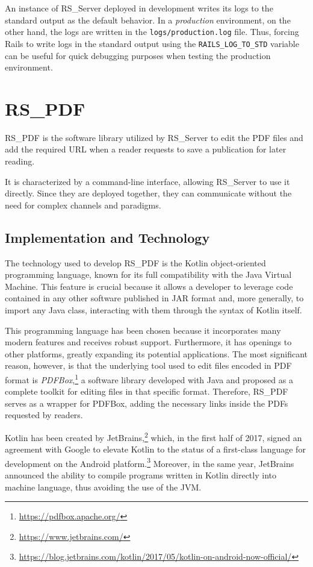 \documentclass[a4paper, english]{article}
\newcommand{\rsserver}{RS\_Server\xspace}
\newcommand{\rspdf}{RS\_PDF\xspace}
\begin{document}
An instance of \rsserver deployed in development writes its logs to the standard output as the default behavior. In a \emph{production} environment, on the other hand, the logs are written in the \verb|logs/production.log| file. Thus, forcing Rails to write logs in the standard output using the \verb|RAILS_LOG_TO_STD| variable can be useful for quick 
debugging purposes when testing the production environment.

\section{\rspdf}

\label{rs-pdf}

\rspdf \cite{RS-PDF} is the software library utilized by \rsserver to edit the PDF files and add the required URL when a reader requests to save a publication for later reading. 

It is characterized by a command-line interface, allowing \rsserver to use it directly. Since they are deployed together, they can communicate without the need for complex channels and paradigms.

\subsection{Implementation and Technology}

The technology used to develop \rspdf is the Kotlin object-oriented programming language, known for its full compatibility with the Java Virtual Machine. This feature is crucial because it allows a developer to leverage code contained in any other software published in JAR format and, more generally, to import any Java class, interacting with them through the syntax of Kotlin itself.

This programming language has been chosen because it incorporates many modern features and receives robust support. Furthermore, it has openings to other platforms, greatly expanding its potential applications. The most significant reason, however, is that the underlying tool used to edit files encoded in PDF format is \emph{PDFBox},\footnote{\url{https://pdfbox.apache.org/}} a software library developed with Java and proposed as a complete toolkit for editing files in that specific format. Therefore, \rspdf serves as a wrapper for PDFBox, adding the necessary links inside the PDFs requested by readers.


Kotlin has been created by JetBrains,\footnote{\url{https://www.jetbrains.com/}} which, in the first half of 2017, signed an agreement with Google to elevate Kotlin to the status of a first-class language for development on the Android platform.\footnote{\url{https://blog.jetbrains.com/kotlin/2017/05/kotlin-on-android-now-official/}} Moreover, in the same year, JetBrains announced the ability to compile programs written in Kotlin directly into machine language, thus avoiding the use of the JVM.
\end{document}
